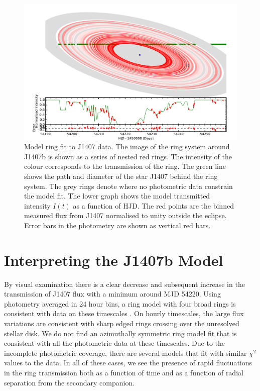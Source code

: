 \documentclass{emulateapj}
\begin{document}
\begin{figure}
\centering
\includegraphics[angle=90,width=12cm]{fig5}

\caption{Model ring fit to J1407 data.
The image of the ring system around J1407b is shown as a series of
nested red rings.
The intensity of the colour corresponds to the transmission of the ring.
The green line shows the path and diameter of the star J1407 behind the
ring system.
The grey rings denote where no photometric data constrain the model fit.
The lower graph shows the model transmitted intensity $I(t)$ as a
function of HJD.
The red points are the binned measured flux from J1407 normalised to
unity outside the eclipse.
Error bars in the photometry are shown as vertical red bars.
\label{fig:taufit}}

\end{figure}


\section{Interpreting the J1407b Model}
\label{sec:structure}

By visual examination there is a clear decrease and subsequent increase
in the transmission of J1407 flux with a minimum around MJD 54220.
Using photometry averaged in 24 hour bins, a ring model with four broad
rings is consistent with data on these timescales \citep{Mamajek12}.
On hourly timescales, the large flux variations are consistent with
sharp edged rings crossing over the unresolved stellar disk.
We do not find an azimuthally symmetric ring model fit that is
consistent with all the photometric data at these timescales.
Due to the incomplete photometric coverage, there are several models
that fit with similar $\chi^2$ values to the data.
In all of these cases, we see the presence of rapid fluctuations in the
ring transmission both as a function of time and as a function of radial
separation from the secondary companion.
\end{document}
